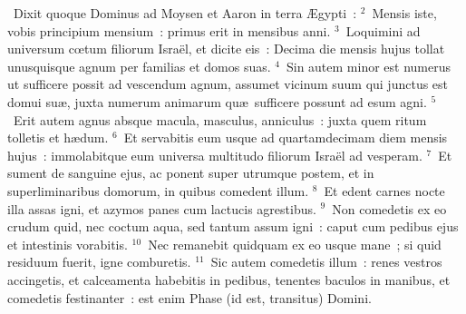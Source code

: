 ~Dixit quoque Dominus ad Moysen et Aaron in terra \AE gypti~:
${}^{2}$~Mensis iste, vobis principium mensium~: primus erit in mensibus anni.
${}^{3}$~Loquimini ad universum cœtum filiorum Isra\"el, et dicite eis~: Decima die mensis hujus tollat unusquisque agnum per familias et domos suas.
${}^{4}$~Sin autem minor est numerus ut sufficere possit ad vescendum agnum, assumet vicinum suum qui junctus est domui su\ae , juxta numerum animarum qu\ae\ sufficere possunt ad esum agni.
${}^{5}$~Erit autem agnus absque macula, masculus, anniculus~: juxta quem ritum tolletis et h\ae dum.
${}^{6}$~Et servabitis eum usque ad quartamdecimam diem mensis hujus~: immolabitque eum universa multitudo filiorum Isra\"el ad vesperam.
${}^{7}$~Et sument de sanguine ejus, ac ponent super utrumque postem, et in superliminaribus domorum, in quibus comedent illum.
${}^{8}$~Et edent carnes nocte illa assas igni, et azymos panes cum lactucis agrestibus.
${}^{9}$~Non comedetis ex eo crudum quid, nec coctum aqua, sed tantum assum igni~: caput cum pedibus ejus et intestinis vorabitis.
${}^{10}$~Nec remanebit quidquam ex eo usque mane~; si quid residuum fuerit, igne comburetis.
${}^{11}$~Sic autem comedetis illum~: renes vestros accingetis, et calceamenta habebitis in pedibus, tenentes baculos in manibus, et comedetis festinanter~: est enim Phase (id est, transitus) Domini.


